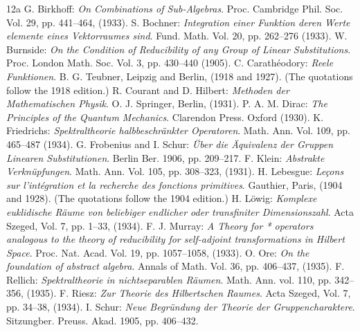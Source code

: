 \documentclass[12pt,b5paper,twoside]{article}
\begin{document}
\clearpage
{}
{}
\renewcommand{\contentsname}{Contents}
\tableofcontents

{}
\renewcommand{\refname}{Bibliography}
\begin{thebibliography}{12a}
 G. Birkhoff: \emph{On Combinations of Sub-Algebras}. Proc. Cambridge Phil. Soc. Vol. 29, pp. 441--464, (1933).
 S. Bochner: \emph{Integration einer Funktion deren Werte elemente eines Vektorraumes sind}. Fund. Math. Vol. 20, pp. 262--276 (1933).
 W. Burnside: \emph{On the Condition of Reducibility of any Group of Linear Substitutions}. Proc. London Math. Soc. Vol. 3, pp. 430--440 (1905).
 C. Carath\'eodory: \emph{Reele Funktionen}. B. G. Teubner, Leipzig and Berlin, (1918 and 1927). (The quotations follow the 1918 edition.)
 R. Courant and D. Hilbert: \emph{Methoden der Mathematischen Physik}. O. J. Springer, Berlin, (1931).
 P. A. M. Dirac: \emph{The Principles of the Quantum Mechanics}. Clarendon Press. Oxford (1930).
 K. Friedrichs: \emph{Spektraltheorie halbbeschr\"ankter Operatoren}. Math. Ann. Vol. 109, pp. 465--487 (1934).
 G. Frobenius and I. Schur: \emph{\"Uber die \"Aquivalenz der Gruppen Linearen Substitutionen}. Berlin Ber. 1906, pp. 209--217.
 F. Klein: \emph{Abstrakte Verkn\"upfungen}. Math. Ann. Vol. 105, pp. 308--323, (1931).
 H. Lebesgue: \emph{Le\c{c}ons sur l'int\'egration et la recherche des fonctions primitives}. Gauthier, Paris, (1904 and 1928). (The quotations follow the 1904 edition.)
 H. L\"owig: \emph{Komplexe euklidische R\"aume von beliebiger endlicher oder transfiniter Dimensionszahl}. Acta Szeged, Vol. 7, pp. 1--33, (1934).
 F. J. Murray: \emph{A Theory for * operators analogous to the theory of reducibility for self-adjoint transformations in Hilbert Space}. Proc. Nat. Acad. Vol. 19, pp. 1057--1058, (1933).
 O. Ore: \emph{On the foundation of abstract algebra}. Annals of Math. Vol. 36, pp. 406--437, (1935).
 F. Rellich: \emph{Spektraltheorie in nichtseparablen R\"aumen}. Math. Ann. vol. 110, pp. 342--356, (1935).
 F. Riesz: \emph{Zur Theorie des Hilbertschen Raumes}. Acta Szeged, Vol. 7, pp. 34--38, (1934).
 I. Schur: \emph{Neue Begr\"undung der Theorie der Gruppencharaktere}. Sitzungber. Preuss. Akad. 1905, pp. 406--432.

\end{thebibliography}
\end{document}
